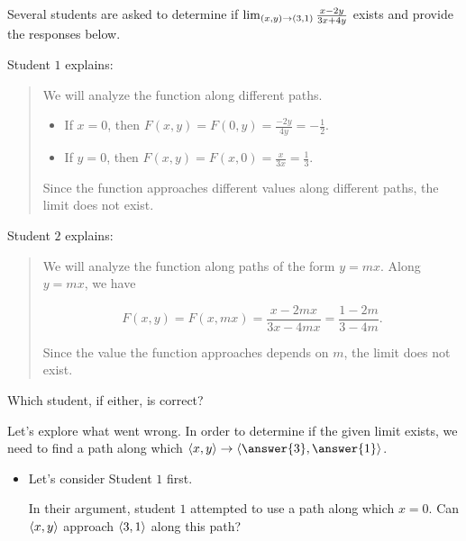 \documentclass{ximera}
\author{Jim Talamo}
\begin{document}
\begin{exercise}

Several students are asked to determine if $\lim_{\left(x,y\right) \to \left(3,1\right)} \frac{x-2y}{3x+4y}$ exists and provide the responses below.

Student $1$ explains:

\begin{quote}
We will analyze the function along different paths.

\begin{itemize}
\item If $x=0$, then $F(x,y) = F(0,y) = \frac{-2y}{4y} = -\frac{1}{2}$.
\item If $y=0$, then $F(x,y) = F(x,0) = \frac{x}{3x} = \frac{1}{3}$.
\end{itemize}

Since the function approaches different values along different paths, the limit does not exist.
\end{quote}

Student $2$ explains:

\begin{quote}
We will analyze the function along paths of the form $y=mx$.  Along $y=mx$, we have

\[
F(x,y)=F(x,mx) = \frac{x-2mx}{3x-4mx} = \frac{1-2m}{3-4m}.
\]

Since the value the function approaches depends on $m$, the limit does not exist.
\end{quote}

Which student, if either, is correct?

\begin{multipleChoice}
\end{multipleChoice}

\begin{exercise}
Let's explore what went wrong.  In order to determine if the given limit exists, we need to find a path along which $\vector{x,y} \to \vector{\answer{3},\answer{1}}$.

\begin{itemize}
\item Let's consider Student $1$ first.

In their argument, student $1$ attempted to use a path along which $x=0$.  Can $\left\langle x,y\right\rangle$ approach $\left\langle 3,1\right\rangle$ along this path? 


\end{itemize}
\end{exercise}
\end{exercise}
\end{document}
